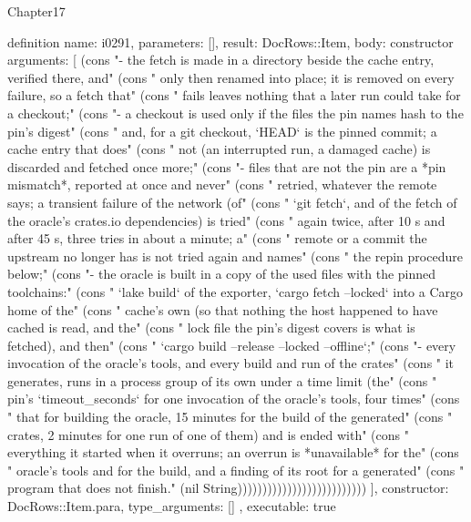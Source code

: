 \begin{lexlean}{Chapter17}
\begin{semanticmodule}
definition{
  name: i0291,
  parameters: [],
  result: DocRows::Item,
  body: constructor{
    arguments: [
      (cons "- the fetch is made in a directory beside the cache entry, verified there, and" (cons "  only then renamed into place; it is removed on every failure, so a fetch that" (cons "  fails leaves nothing that a later run could take for a checkout;" (cons "- a checkout is used only if the files the pin names hash to the pin's digest" (cons "  and, for a git checkout, `HEAD` is the pinned commit; a cache entry that does" (cons "  not (an interrupted run, a damaged cache) is discarded and fetched once more;" (cons "- files that are not the pin are a *pin mismatch*, reported at once and never" (cons "  retried, whatever the remote says; a transient failure of the network (of" (cons "  `git fetch`, and of the fetch of the oracle's crates.io dependencies) is tried" (cons "  again twice, after 10 s and after 45 s, three tries in about a minute; a" (cons "  remote or a commit the upstream no longer has is not tried again and names" (cons "  the repin procedure below;" (cons "- the oracle is built in a copy of the used files with the pinned toolchains:" (cons "  `lake build` of the exporter, `cargo fetch --locked` into a Cargo home of the" (cons "  cache's own (so that nothing the host happened to have cached is read, and the" (cons "  lock file the pin's digest covers is what is fetched), and then" (cons "  `cargo build --release --locked --offline`;" (cons "- every invocation of the oracle's tools, and every build and run of the crates" (cons "  it generates, runs in a process group of its own under a time limit (the" (cons "  pin's `timeout_seconds` for one invocation of the oracle's tools, four times" (cons "  that for building the oracle, 15 minutes for the build of the generated" (cons "  crates, 2 minutes for one run of one of them) and is ended with" (cons "  everything it started when it overruns; an overrun is *unavailable* for the" (cons "  oracle's tools and for the build, and a finding of its root for a generated" (cons "  program that does not finish." (nil String))))))))))))))))))))))))))
    ],
    constructor: DocRows::Item.para,
    type_arguments: []
  },
  executable: true
}


\end{semanticmodule}
\end{lexlean}
